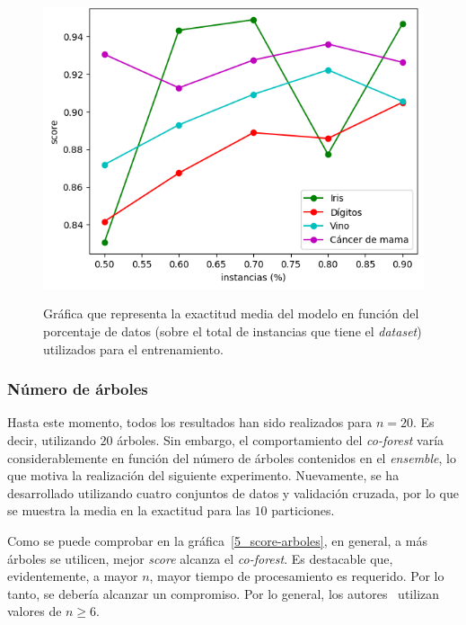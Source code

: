 \begin{figure}[h]
	\caption{Gráfica que representa la exactitud media del modelo en función del porcentaje de datos (sobre el total de instancias que tiene el \textit{dataset}) utilizados para el entrenamiento.}
	\centering
	\includegraphics[width=\textwidth]{../img/memoria/5_score-porcentaje_entrenamiento}
	\label{5_score-porcentaje_entrenamiento}
\end{figure}

\subsubsection{Número de árboles}

Hasta este momento, todos los resultados han sido realizados para $n=20$. Es decir, utilizando $20$ árboles. Sin embargo, el comportamiento del \textit{co-forest} varía considerablemente en función del número de árboles contenidos en el \textit{ensemble}, lo que motiva la realización del siguiente experimento. Nuevamente, se ha desarrollado utilizando cuatro conjuntos de datos y validación cruzada, por lo que se muestra la media en la exactitud para las $10$ particiones.

Como se puede comprobar en la gráfica~\ref{5_score-arboles}, en general, a más árboles se utilicen, mejor \textit{score} alcanza el \textit{co-forest}. Es destacable que, evidentemente, a mayor $n$, mayor tiempo de procesamiento es requerido. Por lo tanto, se debería alcanzar un compromiso. Por lo general, los autores~\cite{originalCoForest2007} utilizan valores de $n \geq 6$.

